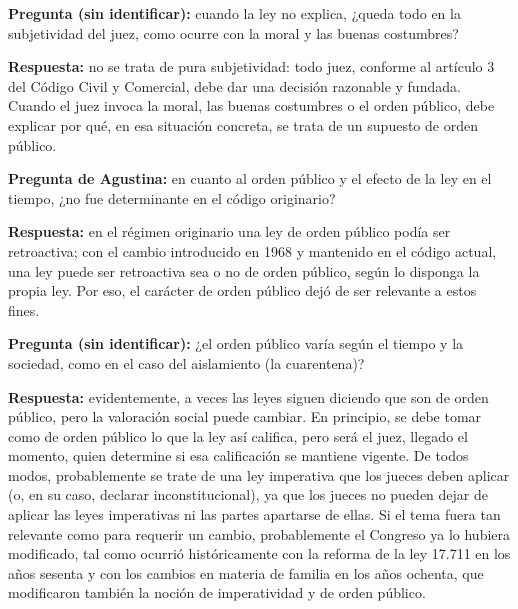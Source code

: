 \documentclass[12pt,oneside]{book}
\begin{document}
\begin{note}
\textbf{Pregunta (sin identificar):} cuando la ley no explica, ¿queda todo en la subjetividad del juez, como ocurre con la moral y las buenas costumbres?

\textbf{Respuesta:} no se trata de pura subjetividad: todo juez, conforme al artículo 3 del Código Civil y Comercial, debe dar una decisión razonable y fundada. Cuando el juez invoca la moral, las buenas costumbres o el orden público, debe explicar por qué, en esa situación concreta, se trata de un supuesto de orden público.
\end{note}

\begin{note}
\textbf{Pregunta de Agustina:} en cuanto al orden público y el efecto de la ley en el tiempo, ¿no fue determinante en el código originario?

\textbf{Respuesta:} en el régimen originario una ley de orden público podía ser retroactiva; con el cambio introducido en 1968 y mantenido en el código actual, una ley puede ser retroactiva sea o no de orden público, según lo disponga la propia ley. Por eso, el carácter de orden público dejó de ser relevante a estos fines.
\end{note}

\begin{note}
\textbf{Pregunta (sin identificar):} ¿el orden público varía según el tiempo y la sociedad, como en el caso del aislamiento (la cuarentena)?

\textbf{Respuesta:} evidentemente, a veces las leyes siguen diciendo que son de orden público, pero la valoración social puede cambiar. En principio, se debe tomar como de orden público lo que la ley así califica, pero será el juez, llegado el momento, quien determine si esa calificación se mantiene vigente. De todos modos, probablemente se trate de una ley imperativa que los jueces deben aplicar (o, en su caso, declarar inconstitucional), ya que los jueces no pueden dejar de aplicar las leyes imperativas ni las partes apartarse de ellas. Si el tema fuera tan relevante como para requerir un cambio, probablemente el Congreso ya lo hubiera modificado, tal como ocurrió históricamente con la reforma de la ley 17.711 en los años sesenta y con los cambios en materia de familia en los años ochenta, que modificaron también la noción de imperatividad y de orden público.
\end{note}
\end{document}
